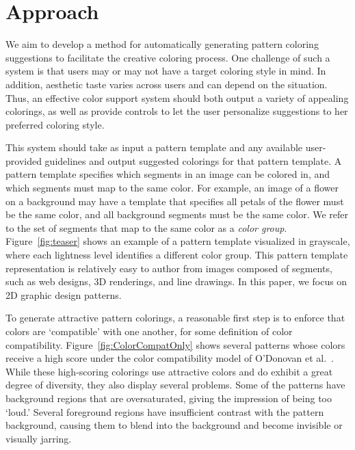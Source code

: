 \section{Approach}
\label{sec:approach}

We aim to develop a method for automatically generating pattern coloring suggestions to facilitate the creative coloring process. One challenge of such a system is that users may or may not have a target coloring style in mind. In addition, aesthetic taste varies across users and can depend on the situation. Thus, an effective color support system should both output a variety of appealing colorings, as well as provide controls to let the user personalize suggestions to her preferred coloring style.

This system should take as input a pattern template and any available user-provided guidelines and output suggested colorings for that pattern template. A pattern template specifies which segments in an image can be colored in, and which segments must map to the same color. For example, an image of a flower on a background may have a template that specifies all petals of the flower must be the same color, and all background segments must be the same color. We refer to the set of segments that map to the same color as a \emph{color group}. Figure~\ref{fig:teaser} shows an example of a pattern template visualized in grayscale, where each lightness level identifies a different color group. This pattern template representation is relatively easy to author from images composed of segments, such as web designs, 3D renderings, and line drawings. In this paper, we focus on 2D graphic design patterns.

To generate attractive pattern colorings, a reasonable first step is to enforce that colors are `compatible' with one another, for some definition of color compatibility. Figure~\ref{fig:ColorCompatOnly} shows several patterns whose colors receive a high score under the color compatibility model of O'Donovan et al.~. While these high-scoring colorings use attractive colors and do exhibit a great degree of diversity, they also display several problems. Some of the patterns have background regions that are oversaturated, giving the impression of being too `loud.' Several foreground regions have insufficient contrast with the pattern background, causing them to blend into the background and become invisible or visually jarring.

